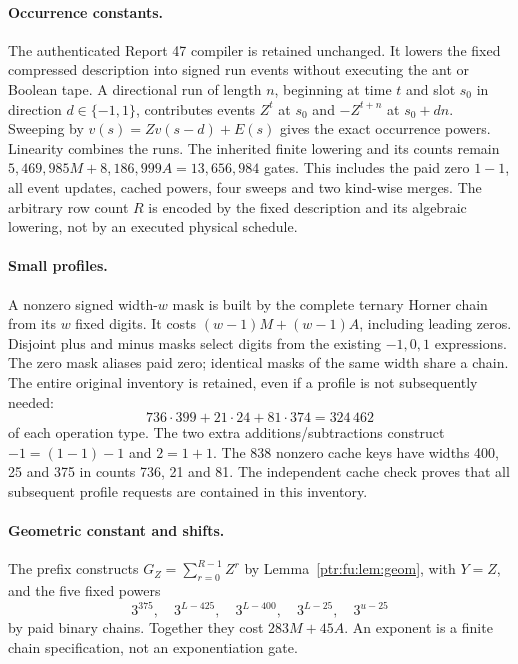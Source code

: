 \documentclass[11pt,letterpaper]{article}
\theoremstyle{definition}\newtheorem{definition}[theorem]{Definition}
\theoremstyle{remark}\newtheorem{remark}[theorem]{Remark}
\begin{document}
\paragraph{Occurrence constants.}
The authenticated Report 47 compiler is retained unchanged. It lowers the fixed compressed description into signed run events without executing the ant or Boolean tape. A directional run of length $n$, beginning at time $t$ and slot $s_0$ in direction $d\in\{-1,1\}$, contributes events $Z^t$ at $s_0$ and $-Z^{t+n}$ at $s_0+dn$. Sweeping by $v(s)=Zv(s-d)+E(s)$ gives the exact occurrence powers. Linearity combines the runs. The inherited finite lowering and its counts remain $5,469,985M+8,186,999A=13,656,984$ gates. This includes the paid zero $1-1$, all event updates, cached powers, four sweeps and two kind-wise merges. The arbitrary row count $R$ is encoded by the fixed description and its algebraic lowering, not by an executed physical schedule.

\paragraph{Small profiles.}
A nonzero signed width-$w$ mask is built by the complete ternary Horner chain from its $w$ fixed digits. It costs $(w-1)M+(w-1)A$, including leading zeros. Disjoint plus and minus masks select digits from the existing $-1,0,1$ expressions. The zero mask aliases paid zero; identical masks of the same width share a chain. The entire original inventory is retained, even if a profile is not subsequently needed:
\[
 736\cdot399+21\cdot24+81\cdot374=324\,462
\]
of each operation type. The two extra additions/subtractions construct $-1=(1-1)-1$ and $2=1+1$. The 838 nonzero cache keys have widths 400, 25 and 375 in counts 736, 21 and 81. The independent cache check proves that all subsequent profile requests are contained in this inventory.

\paragraph{Geometric constant and shifts.}
The prefix constructs $G_Z=\sum_{r=0}^{R-1}Z^r$ by Lemma~\ref{ptr:fu:lem:geom}, with $Y=Z$, and the five fixed powers
\[
 3^{375},\quad3^{L-425},\quad3^{L-400},\quad3^{L-25},\quad3^{u-25}
\]
by paid binary chains. Together they cost $283M+45A$. An exponent is a finite chain specification, not an exponentiation gate.
\end{document}
